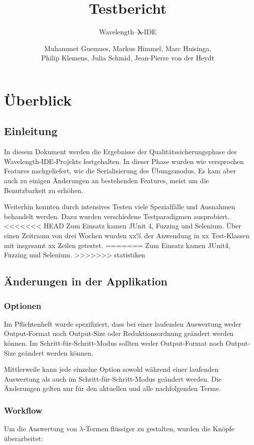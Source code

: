 \documentclass[parskip=full,11pt,openany]{scrreprt}
\title{Testbericht}
\subtitle{Wavelength--$\bm{\lambda}$-IDE}
\author{Muhammet Guemues, Markus Himmel, Marc Huisinga,\\Philip Klemens, Julia Schmid, Jean-Pierre von der Heydt}
\begin{document}
\maketitle
\newpage
\tableofcontents
\newpage

\chapter{Überblick}

\section{Einleitung}

In diesem Dokument werden die Ergebnisse der Qualitätssicherungsphase des Wavelength-IDE-Projekts festgehalten.
In dieser Phase wurden wie versprochen Features nachgeliefert, wie die Serialisierung des Übungsmodus.
Es kam aber auch zu einigen Änderungen an bestehenden Features, meist um die Benutzbarkeit zu erhöhen.

Weiterhin konnten durch intensives Testen viele Spezialfälle und Ausnahmen behandelt werden.
Dazu wurden verschiedene Testparadigmen ausprobiert.
<<<<<<< HEAD
Zum Einsatz kamen JUnit 4, Fuzzing und Selenium.
Über einen Zeitraum von drei Wochen wurden xx\% der Anwendung in xx Test-Klassen mit insgesamt xx Zeilen getestet.
=======
Zum Einsatz kamen JUnit4, Fuzzing und Selenium.
>>>>>>> statistiken

\section{Änderungen in der Applikation}
\subsection{Optionen}
Im Pflichtenheft wurde spezifiziert, dass bei einer laufenden Auswertung weder Output-Format noch Output-Size
oder Reduktionsordnung geändert werden können. Im Schritt-für-Schritt-Modus sollten weder Output-Format noch
Output-Size geändert werden können. 

Mittlerweile kann jede einzelne Option sowohl während einer laufenden Auswertung als auch im Schritt-für-Schritt-Modus
geändert werden. Die Änderungen gelten nur für den aktuellen und alle nachfolgenden Terme.

\subsection{Workflow}\label{changeWorkflow}
Um die Auswertung von $\lambda$-Termen flüssiger zu gestalten, wurden die Knöpfe überarbeitet:
\end{document}
